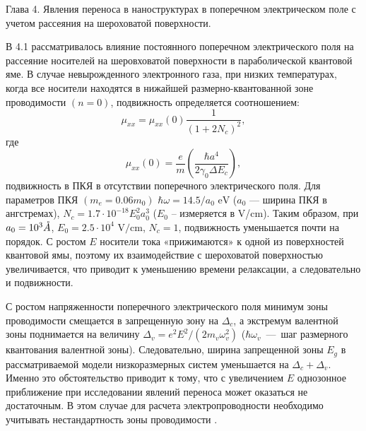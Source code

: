 Глава 4. Явления переноса в наноструктурах в поперечном электрическом поле с учетом рассеяния на шероховатой поверхности.

В 4.1 рассматривалось влияние постоянного поперечном электрического поля на рассеяние носителей на шеровховатой поверхности в параболической квантовой яме. В случае невырожденного электронного газа, при низких температурах, когда все носители находятся в нижайшей размерно-квантованной зоне проводимости $(n=0)$, подвижность определяется соотношением:
\begin{equation} \label{eq:syn_23}
\mu_{xx} =\mu_{xx}(0)\frac{1}{\left(1+2 N_c \right)^2 } ,
\end{equation}
где
\[
\mu_{xx}(0)=\frac{e}{m} \left(\frac{\hbar a^4 }{2\gamma_0 \Delta E_c } \right),
\]
подвижность в ПКЯ в отсутствии поперечного электрического поля.
Для параметров ПКЯ $(m_e = 0.06 m_0 )$ $\hbar \omega = 14.5/a_0 \text{ eV}$ ($a_0 $ --- ширина ПКЯ в ангстремах), $N_c =1.7\cdot 10^{-18} E_0^2 a_0^3 $ ($E_0 $ -- измеряется в V/cm). Таким образом, при $a_0 = 10^3 \AA$, $E_0 = 2.5\cdot 10^4 \text{ V/cm}$, $N_c =1$, подвижность уменьшается почти на порядок. С ростом $E$ носители тока «прижимаются» к одной из поверхностей квантовой ямы, поэтому их взаимодействие с шероховатой поверхностью увеличивается, что приводит к уменьшению времени релаксации, а следовательно и подвижности.

С ростом напряженности поперечного электрического поля минимум зоны проводимости смещается в запрещенную зону на $\Delta_c $, а экстремум валентной зоны поднимается на величину $\Delta_v =e^2 E^2  / (2m_v  \omega_v^2 )$ ($\hbar \omega_v $~---~шаг размерного квантования валентной зоны). Следовательно, ширина запрещенной зоны $E_g$ в рассматриваемой модели низкоразмерных систем уменьшается на $\Delta_c +\Delta_v $. Именно это обстоятельство приводит к тому, что с увеличением $E$ однозонное приближение при исследовании явлений переноса может оказаться не достаточным. В этом случае для расчета электропроводности необходимо учитывать нестандартность зоны проводимости \cite{Lax1960,Cohen1961}.

